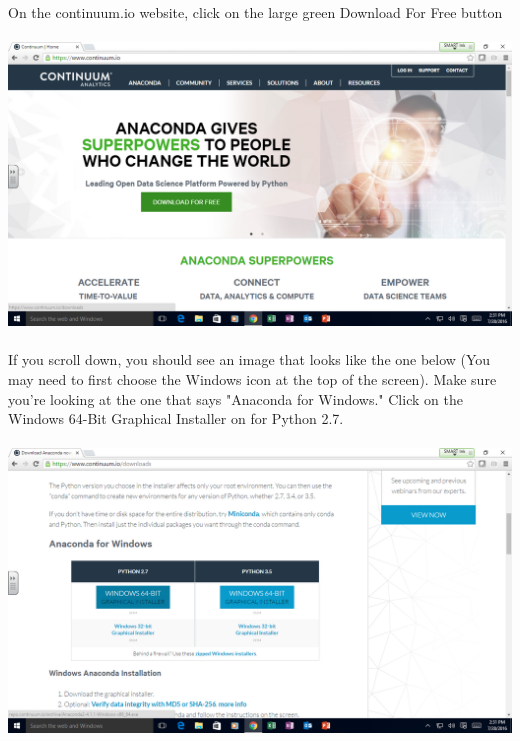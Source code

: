 \documentclass[]{article}
\begin{document}
\paragraph{}
On the continuum.io website, click on the large green Download For Free button
\paragraph{}
\begin{centering}
    \centerline{\includegraphics[scale=0.35]{Screenshot_2.png}}
\end{centering}

\paragraph{}
If you scroll down, you should see an image that looks like the one below (You may need to first choose the Windows icon at the top of the screen). Make sure you're looking at the one that says "Anaconda for Windows." Click on the Windows 64-Bit Graphical Installer on for Python 2.7.
\paragraph{}
\begin{centering}
    \centerline{\includegraphics[scale=0.35]{Screenshot_3.png}}
\end{centering}
\end{document}
